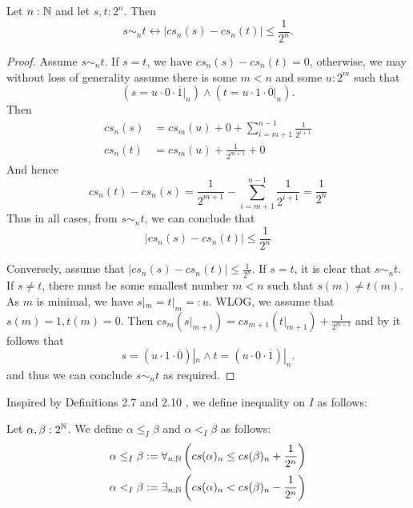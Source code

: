  
\begin{corollary}\label{alternativeSimByCauchyDistance}
  Let $n:\mathbb{N}$ and let $s,t:2^n$. Then 
  \begin{equation}
    s\sim_n t \leftrightarrow |cs_n(s) - cs_n(t)| \leq \frac{1}{2^{n}}.
  \end{equation} 
\end{corollary}

\begin{proof}
  \item  
    Assume $ s \sim_n t$. If $s=t$, we have $cs_n(s) - cs_n(t) = 0$, 
    otherwise, we may without loss of generality assume there is some $m<n$ and some $u:2^m$ such that 
  \begin{equation}
    (s = u \cdot 0 \cdot \overline 1|_n) \wedge ( t = u \cdot 1 \cdot \overline 0 |_n) . 
  \end{equation}
  Then 
  \begin{align}
    cs_n(s) &= 
    cs_m(u) + 0 + \sum\limits_{i = m+1}^{n-1} \frac{1}{2^{i+1}}\\
    cs_n(t) &= 
    cs_m(u) + \frac{1}{2^{m+1}} + 0  
  \end{align}
  And hence 
  \begin{equation}
    cs_n(t) - cs_n(s) = \frac{1}{2^{m+1}} - \sum\limits_{i = m+1}^{n-1} \frac{1}{2^{i+1}} = \frac{1}{2^n}
  \end{equation}
  Thus in all cases, from $s\sim_n t$, we can conclude that 
  \begin{equation}
    |cs_n(s) -cs_n(t) |\leq \frac{1}{2^n}
  \end{equation}
  \item 
  Conversely, assume that $|cs_n(s) - cs_n(t)| \leq \frac{1}{2^n}$. 
  If $s = t$, it is clear that $s \sim_n t$.
  If $s\neq t$, there must be some smallest number $m<n$ such that 
  $s(m) \neq t(m)$. As $m$ is minimal, we have $s|_m = t|_m = : u$. 
  WLOG, we assume that $s(m) = 1, t(m) = 0$. 
  Then $cs_m(s|_{m+1})  = cs_{m+1}(t|_{m+1}) + \frac{1}{2^{m+1}}$
  and by  it follows that 
  \begin{equation}
    s = (u \cdot 1\cdot \overline 0) |_n \wedge 
    t = (u \cdot 0\cdot \overline 1) |_n.
  \end{equation}
  and thus we can conclude $s\sim_n t$ as required. 
\end{proof}


Inspired by Definitions 2.7 and 2.10 \Cite{Bishop}, 
we define inequality on $I$ as follows:
\begin{definition}
  Let $\alpha,\beta:2^{\mathbb{N}}$. 
  We define $\alpha\leq_I \beta$ and $\alpha<_I\beta$ as follows:
  \begin{align}
  \alpha\leq_I\beta : = \forall_{n:\mathbb{N}} \left( cs(\alpha)_n \leq cs(\beta)_n + \frac {1} {2^n}\right)\\ 
    \alpha   <_I \beta : = \exists_{n:\mathbb{N}} \left( cs(\alpha)_n < cs(\beta)_n - \frac {1} {2^n}\right)
\end{align}
\end{definition}

